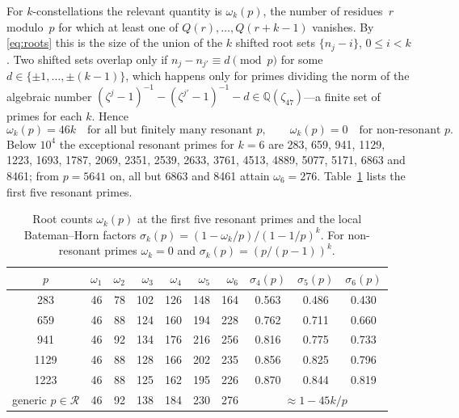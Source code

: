 ﻿\documentclass[11pt,a4paper]{article}
\begin{document}
For $k$-constellations the relevant quantity is $\omega_k(p)$, the number of
residues~$r$ modulo~$p$ for which at least one of $Q(r), \ldots, Q(r{+}k{-}1)$
vanishes.  By \eqref{eq:roots} this is the size of the union of the $k$ shifted
root sets $\{n_j - i\}$, $0 \leq i < k$.  Two shifted sets overlap only if
$n_j - n_{j'} \equiv d \pmod p$ for some $d \in \{\pm 1, \ldots, \pm(k{-}1)\}$,
which happens only for primes dividing the norm of the algebraic number
$(\zeta^j-1)^{-1} - (\zeta^{j'}-1)^{-1} - d \in \mathbb{Q}(\zeta_{47})$---a
finite set of primes for each $k$.  Hence
\begin{equation}\label{eq:omegak}
  \omega_k(p) = 46k \quad\text{for all but finitely many resonant } p,
  \qquad \omega_k(p) = 0 \quad\text{for non-resonant } p .
\end{equation}
Below $10^4$ the exceptional resonant primes for $k = 6$ are
283, 659, 941, 1129, 1223, 1693, 1787, 2069, 2351, 2539, 2633, 3761, 4513,
4889, 5077, 5171, 6863 and 8461; from $p = 5641$ on, all but 6863 and 8461
attain $\omega_6 = 276$.  Table~\ref{tab:omega} lists the first five resonant primes.

\begin{table}[H]
\centering
\caption{Root counts $\omega_k(p)$ at the first five resonant primes and the
local Bateman--Horn factors $\sigma_k(p) = (1 - \omega_k/p)/(1 - 1/p)^k$.
For non-resonant primes $\omega_k = 0$ and $\sigma_k(p) = (p/(p{-}1))^k$.}\label{tab:omega}
\smallskip
\begin{tabular}{crrrrrrccc}
\toprule
$p$ & $\omega_1$ & $\omega_2$ & $\omega_3$ & $\omega_4$ & $\omega_5$ & $\omega_6$ &
  $\sigma_4(p)$ & $\sigma_5(p)$ & $\sigma_6(p)$ \\
\midrule
283  & 46 & 78 & 102 & 126 & 148 & 164 & 0.563 & 0.486 & 0.430 \\
659  & 46 & 88 & 124 & 160 & 194 & 228 & 0.762 & 0.711 & 0.660 \\
941  & 46 & 92 & 134 & 176 & 216 & 256 & 0.816 & 0.775 & 0.733 \\
1129 & 46 & 88 & 128 & 166 & 202 & 235 & 0.856 & 0.825 & 0.796 \\
1223 & 46 & 88 & 125 & 162 & 195 & 226 & 0.870 & 0.844 & 0.819 \\
\midrule
generic $p \in \mathcal{R}$ & 46 & 92 & 138 & 184 & 230 & 276 &
  \multicolumn{3}{c}{$\approx 1 - 45k/p$} \\
\bottomrule
\end{tabular}
\end{table}
\end{document}
